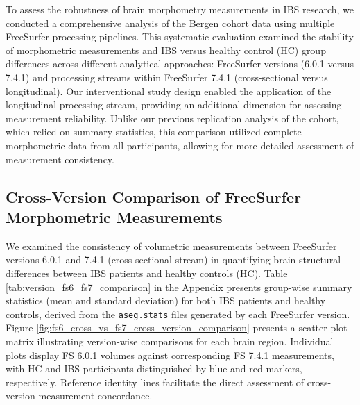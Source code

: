 \documentclass[diagnostics,article,accept,pdftex,moreauthors]{Definitions/mdpi}
\begin{document}
To assess the robustness of brain morphometry measurements in IBS research, we conducted a comprehensive analysis of the Bergen cohort data using multiple FreeSurfer processing pipelines. This systematic evaluation examined the stability of morphometric measurements and IBS versus healthy control (HC) group differences across different analytical approaches: FreeSurfer versions (6.0.1 versus 7.4.1) and processing streams within FreeSurfer 7.4.1 (cross-sectional versus longitudinal). Our interventional study design enabled the application of the longitudinal processing stream, providing an additional dimension for assessing measurement reliability. Unlike our previous replication analysis of the \cite{Skrobisz2022} cohort, which relied on summary statistics, this comparison utilized complete morphometric data from all participants, allowing for more detailed assessment of measurement consistency.


\subsection{Cross-Version Comparison of FreeSurfer Morphometric Measurements}

We examined the consistency of volumetric measurements between FreeSurfer versions 6.0.1 and 7.4.1 (cross-sectional stream) in quantifying brain structural differences between IBS patients and healthy controls (HC).  Table \ref{tab:version_fs6_fs7_comparison} in the Appendix presents group-wise summary statistics (mean and standard deviation) for both IBS patients and healthy controls, derived from the \texttt{aseg.stats} files generated by each FreeSurfer version. Figure \ref{fig:fs6_cross_vs_fs7_cross_version_comparison} presents a scatter plot matrix illustrating version-wise comparisons for each brain region. Individual plots display FS 6.0.1 volumes against corresponding FS 7.4.1 measurements, with HC and IBS participants distinguished by blue and red markers, respectively. Reference identity lines facilitate the direct assessment of cross-version measurement concordance.
\end{document}

